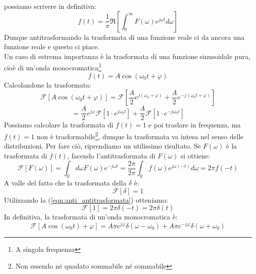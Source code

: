 \documentclass{book}
\begin{document}
        possiamo scrivere in definitiva:
        \begin{equation}
            f(t) = \frac{1}{\pi} \Re[\int_{0} ^{\infty} F(\omega)e^{j \omega t}d \omega]
        \end{equation}
        Dunque antitrasformando la trasformata di una funzione reale ci da ancora una funzione reale e questo ci piace. \\
        Un caso di estrema importanza è la trasformata di una funzione sinusoidale pura, cioè di un'onda monocromatica\footnote{A singola frequenza}
        \begin{equation}
            f(t) = A \cos{(\omega_{0}t+\varphi)}
        \end{equation}
        Calcolandone la trasformata:
        \begin{equation}
            \mathcal{F}[A \cos{(\omega_{0}t+\varphi)}] = \mathcal{F}[\frac{A}{2}e^{j(\omega_{0}+\varphi)}+\frac{A}{2}e^{-j(\omega_{0}t+\varphi)}]
        \end{equation}
        \begin{equation}
             = \frac{A}{2}e^{j \varphi} \mathcal{F}[1 \cdot e^{j \omega_{0}t}]+\frac{A}{2}\mathcal{F}[1 \cdot e^{-j \omega_{0}t}]
        \end{equation}
        Possiamo calcolare la trasformata di $f(t) = 1$ e poi traslare in frequenza, ma $f(t)=1$ non è trasformabile\footnote{Non essendo né quadato sommabile né sommabile}, dunque la trasformata va intesa nel senso delle distribuzioni. Per fare ciò, riprendiamo un utilissimo risultato. Se $F(\omega)$ è la trasformata di $f(t)$, facendo l'antitrasformata di $F(\omega)$ si ottiene:
        \begin{equation}
        \label{eqn:anti_antitrasformata}
            \mathcal{F}[F(\omega)] = \int_{\mathbb{R}} d\omega F(\omega) e^{-j \omega t} = \frac{2\pi}{2\pi} \int_{\mathbb{R}}f(\omega)e^{j \omega(-t)}d \omega = 2 \pi f(-t)
        \end{equation}
        A valle del fatto che la trasformata della $\delta$ è:
        \begin{equation}
            \mathcal{F}[\delta] = 1
        \end{equation}
        Utilizzando la (\ref{eqn:anti_antitrasformata}) otteniamo:
        \begin{equation}
            \mathcal{F}[1] = 2 \pi \delta(-t) = 2\pi \delta(t)
        \end{equation}
        In definitiva, la trasformata di un'onda monocromatica è:
        \begin{equation}
            \mathcal{F}[A \cos{(\omega_{0}t)}+\varphi] = A \pi e^{j \varphi}\delta(\omega-\omega_{0})+A \pi e^{-j \varphi}\delta(\omega+\omega_{0})
        \end{equation}
\end{document}
